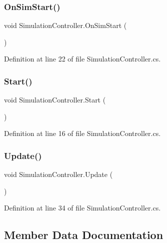 \subsubsection{On\+Sim\+Start()}
{\footnotesize\ttfamily void Simulation\+Controller.\+On\+Sim\+Start (\begin{DoxyParamCaption}{ }\end{DoxyParamCaption})}



Definition at line 22 of file Simulation\+Controller.\+cs.

\mbox{\label{class_simulation_controller_a471c225bcca33b35307084028236c432}} 
\subsubsection{Start()}
{\footnotesize\ttfamily void Simulation\+Controller.\+Start (\begin{DoxyParamCaption}{ }\end{DoxyParamCaption})}



Definition at line 16 of file Simulation\+Controller.\+cs.

\mbox{\label{class_simulation_controller_a784b08988dc5eb32df03fcc431f7c872}} 
\subsubsection{Update()}
{\footnotesize\ttfamily void Simulation\+Controller.\+Update (\begin{DoxyParamCaption}{ }\end{DoxyParamCaption})}



Definition at line 34 of file Simulation\+Controller.\+cs.



\subsection{Member Data Documentation}
\mbox{\label{class_simulation_controller_afcfb1bc038739d65b55fc52034757237}} 
